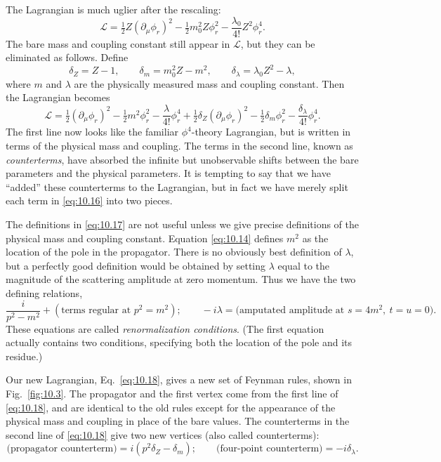 The Lagrangian is much uglier after the rescaling:
\begin{equation}
  \mathcal{L} = \tfrac{1}{2}Z(\partial_\mu\phi_r)^2
    - \tfrac{1}{2}m_0^2Z\phi_r^2 - \frac{\lambda_0}{4!}Z^2\phi_r^4 .
  \label{eq:10.16}
\end{equation}
The bare mass and coupling constant still appear in $\mathcal{L}$, but they can
be eliminated as follows.  Define
\begin{equation}
  \delta_Z = Z - 1,\qquad
  \delta_m = m_0^2Z - m^2,\qquad
  \delta_\lambda = \lambda_0Z^2 - \lambda,
  \label{eq:10.17}
\end{equation}
where $m$ and $\lambda$ are the physically measured mass and coupling
constant.  Then the Lagrangian becomes
\begin{equation}
  \mathcal{L} = \tfrac{1}{2}(\partial_\mu\phi_r)^2
    - \tfrac{1}{2}m^2\phi_r^2 - \frac{\lambda}{4!}\phi_r^4
    + \tfrac{1}{2}\delta_Z(\partial_\mu\phi_r)^2
      - \tfrac{1}{2}\delta_m\phi_r^2 - \frac{\delta_\lambda}{4!}\phi_r^4 .
  \label{eq:10.18}
\end{equation}
The first line now looks like the familiar $\phi^4$-theory Lagrangian, but is
written in terms of the physical mass and coupling.  The terms in the second
line, known as \emph{counterterms}, have absorbed the infinite but
unobservable shifts between the bare parameters and the physical parameters.
It is tempting to say that we have ``added'' these counterterms to the
Lagrangian, but in fact we have merely split each term in \eqref{eq:10.16}
into two pieces.

The definitions in \eqref{eq:10.17} are not useful unless we give precise
definitions of the physical mass and coupling constant.  Equation
\eqref{eq:10.14} defines $m^2$ as the location of the pole in the propagator.
There is no obviously best definition of $\lambda$, but a perfectly good
definition would be obtained by setting $\lambda$ equal to the magnitude of the
scattering amplitude at zero momentum.  Thus we have the two defining
relations,
\begin{equation}
  \frac{i}{p^2-m^2} + (\text{terms regular at } p^2 = m^2) ;
  \qquad -i\lambda = \text{(amputated amplitude at } s = 4m^2,\
    t = u = 0) .
  \label{eq:10.19}
\end{equation}
These equations are called \emph{renormalization conditions}.  (The first
equation actually contains two conditions, specifying both the location of the
pole and its residue.)

Our new Lagrangian, Eq.~\eqref{eq:10.18}, gives a new set of Feynman rules,
shown in Fig.~\ref{fig:10.3}.  The propagator and the first vertex come from
the first line of \eqref{eq:10.18}, and are identical to the old rules except
for the appearance of the physical mass and coupling in place of the bare
values.  The counterterms in the second line of \eqref{eq:10.18} give two new
vertices (also called counterterms):
\begin{equation}
  \text{(propagator counterterm)} = i(p^2\delta_Z - \delta_m);
  \qquad \text{(four-point counterterm)} = -i\delta_\lambda .
  \label{eq:10.20}
\end{equation}


